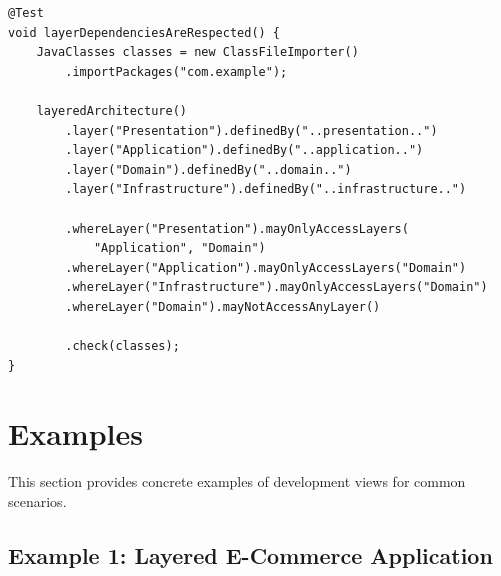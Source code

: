\documentclass[11pt,letterpaper]{article}
\begin{document}
\begin{verbatim}
@Test
void layerDependenciesAreRespected() {
    JavaClasses classes = new ClassFileImporter()
        .importPackages("com.example");
    
    layeredArchitecture()
        .layer("Presentation").definedBy("..presentation..")
        .layer("Application").definedBy("..application..")
        .layer("Domain").definedBy("..domain..")
        .layer("Infrastructure").definedBy("..infrastructure..")
        
        .whereLayer("Presentation").mayOnlyAccessLayers(
            "Application", "Domain")
        .whereLayer("Application").mayOnlyAccessLayers("Domain")
        .whereLayer("Infrastructure").mayOnlyAccessLayers("Domain")
        .whereLayer("Domain").mayNotAccessAnyLayer()
        
        .check(classes);
}
\end{verbatim}

\section{Examples}

This section provides concrete examples of development views for common scenarios.

\subsection{Example 1: Layered E-Commerce Application}
\end{document}
